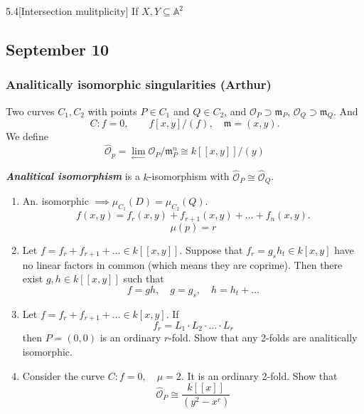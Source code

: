 \begin{manualexercise}{5.4}[Intersection mulitplicity]
	If $X,Y\subseteq \mathbb{A}^{2} $
\end{manualexercise}

\subsection{September 10}

\subsubsection{Analitically isomorphic singularities (Arthur)}
Two curves $C_1,C_2$ with points $P \in C_1$ and $Q\in C_2$, and $\mathcal{O}_P\supset\mathfrak{m}_P$, $\mathcal{O}_Q\supset\mathfrak{m}_Q$. And
\[C:f=0,\qquad f[x,y]/(f), \quad \mathfrak{m}=(x,y).\]
We define
\[\hat{\mathcal{O}}_p=\lim_{\longleftarrow} \mathcal{O}_P/\mathfrak{m}^n_P\cong k[ [x,y]]/(y)\]

\begin{defn}
	\textit{\textbf{Analitical isomorphism}} is a $k$-isomorphism with $\hat{\mathcal{O}}_P\cong \hat{\mathcal{O}}_Q$.
\end{defn}

\begin{manualexercise}{}
	\begin{enumerate}[label=\alph*.]
		\item An. isomorphic $\implies \mu_{C_1}(D)=\mu_{C_2}(Q)$.
\[f(x,y)=f_r(x,y)+f_{r+1}(x,y)+\ldots+f_n(x,y).\]
\[\mu(p)=r\]

\item Let $f=f_r+f_{r+1}+\ldots\in k[[x,y]]$. Suppose that $f_r=g_s h_t\in k[x,y]$ have no linear factors in common (which means they are coprime). Then there exist $g,h\in k[ [ x,y] ]$ such that
	\[f=gh,\quad g=g_s,\quad h=h_t+\ldots\]

	\item Let $f=f_r+f_{r+1}+\ldots\in k[x,y]$. If
		\[f_r=L_1\cdot L_2\cdot \ldots\cdot L_r\]
		then $P=(0,0)$ is an ordinary $r$-fold. Show that any 2-folds are analitically isomorphic.

		\item Consider the curve $C:f=0,\quad \mu=2$. It is an ordinary 2-fold. Show that
			\[\hat{\mathcal{O}}_P\cong \frac{k[ [ x] ]}{(y^2-x^r)}\]
	\end{enumerate}
\end{manualexercise}

